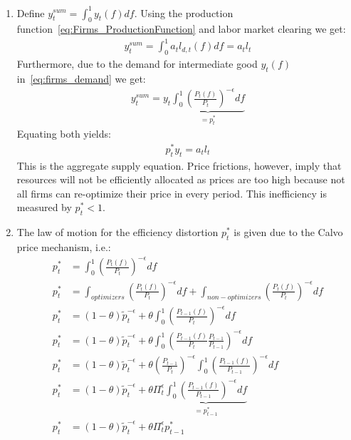 \begin{enumerate}
\item Define \(y_t^{sum} = \int_{0}^1 y_t(f) df\).
Using the production function~\eqref{eq:Firms_ProductionFunction} and labor market clearing we get:
\begin{align}
	y_t^{sum} = \int_{0}^1 a_t l_{d,t}(f) df = a_t l_t
\end{align}
Furthermore, due to the demand for intermediate good \(y_t(f)\) in~\eqref{eq:firms_demand} we get:
\begin{align}
	y_t^{sum} = y_t \underbrace{\int_{0}^1 {\left(\frac{P_t(f)}{P_t}\right)}^{-\epsilon} df}_{=p_t^*}
\end{align}
Equating both yields:
\begin{align}
	p_t^* y_t =  a_t l_t
\end{align}
This is the aggregate supply equation.
Price frictions, however, imply that resources will not be efficiently allocated
  as prices are too high because not all firms can re-optimize their price in every period.
This inefficiency is measured by \(p_t^*<1\).

\item The law of motion for the efficiency distortion \(p_t^*\) is given due to the Calvo price mechanism, i.e.:
\begin{align*}
	p_t^* &= \int_0^1{\left(\frac{P_t(f)}{P_t}\right)}^{-\epsilon} df\\
	p_t^* &= \int_{optimizers} {\left(\frac{P_t(f)}{P_t}\right)}^{-\epsilon} df + \int_{non-optimizers}{\left(\frac{P_t(f)}{P_t}\right)}^{-\epsilon} df\\
	p_t^* & = (1-\theta) \widetilde{p}_t^{-\epsilon} + \theta \int_0^1 {\left(\frac{P_{t-1}(f)}{P_t}\right)}^{-\epsilon} df\\
	p_t^* & = (1-\theta) \widetilde{p}_t^{-\epsilon} + \theta \int_0^1 {\left(\frac{P_{t-1}(f)}{P_t }\frac{P_{t-1}}{P_{t-1}}\right)}^{-\epsilon} df\\
	p_t^* & = (1-\theta) \widetilde{p}_t^{-\epsilon} + \theta {\left(\frac{P_{t-1}}{P_{t}}\right)}^{-\epsilon} \int_0^1 {\left(\frac{P_{t-1}(f)}{P_{t-1} }\right)}^{-\epsilon} df\\
	p_t^* & = (1-\theta) \widetilde{p}_t^{-\epsilon} + \theta \Pi_t^{\epsilon} \underbrace{\int_0^1 {\left(\frac{P_{t-1}(f)}{P_{t-1} }\right)}^{-\epsilon} df}_{=p_{t-1}^*}\\
	p_t^* & = (1-\theta) \widetilde{p}_t^{-\epsilon} + \theta \Pi_t^{\epsilon} p_{t-1}^*
\end{align*}

\end{enumerate}